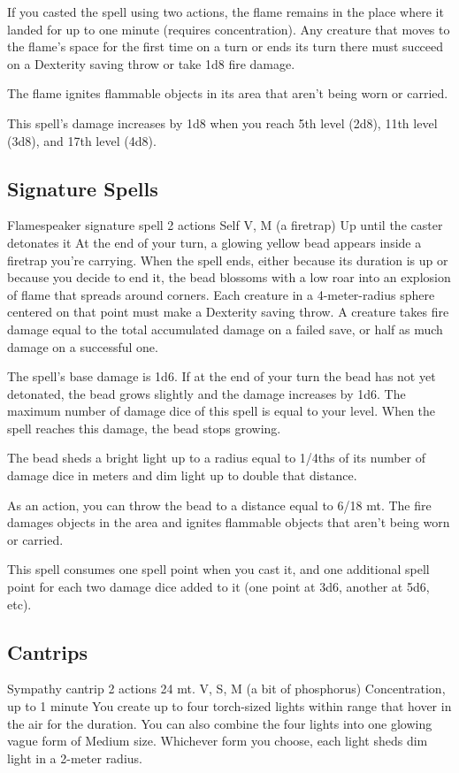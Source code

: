         If you casted the spell using two actions, the flame remains in the place where it landed for up to one minute (requires concentration).
        Any creature that moves to the flame's space for the first time on a turn or ends its turn there must succeed on a Dexterity saving throw or take 1d8 fire damage.

        The flame ignites flammable objects in its area that aren't being worn or carried.

        This spell's damage increases by 1d8 when you reach 5th level (2d8), 11th level (3d8), and 17th level (4d8).
\subsection*{Signature Spells}
        {Flamespeaker signature spell}
        {2 actions}
        {Self}
        {V, M (a firetrap)}
        {Up until the caster detonates it}
        At the end of your turn, a glowing yellow bead appears inside a firetrap you're carrying.
        When the spell ends, either because its duration is up or because you decide to end it, the bead blossoms with a low roar into an explosion of flame that spreads around corners.
        Each creature in a 4-meter-radius sphere centered on that point must make a Dexterity saving throw.
        A creature takes fire damage equal to the total accumulated damage on a failed save, or half as much damage on a successful one.

        The spell's base damage is 1d6.
        If at the end of your turn the bead has not yet detonated, the bead grows slightly and the damage increases by 1d6.
        The maximum number of damage dice of this spell is equal to your level.
        When the spell reaches this damage, the bead stops growing.

        The bead sheds a bright light up to a radius equal to 1/4ths of its number of damage dice in meters and dim light up to double that distance.

        As an action, you can throw the bead to a distance equal to 6/18 mt.
        The fire damages objects in the area and ignites flammable objects that aren't being worn or carried.

        This spell consumes one spell point when you cast it, and one additional spell point for each two damage dice added to it (one point at 3d6, another at 5d6, etc).
\subsection*{Cantrips}
        {Sympathy cantrip}
        {2 actions}
        {24 mt.}
        {V, S, M (a bit of phosphorus)}
        {Concentration, up to 1 minute}
        You create up to four torch-sized lights within range that hover in the air for the duration.
        You can also combine the four lights into one glowing vague form of Medium size.
        Whichever form you choose, each light sheds dim light in a 2-meter radius.

